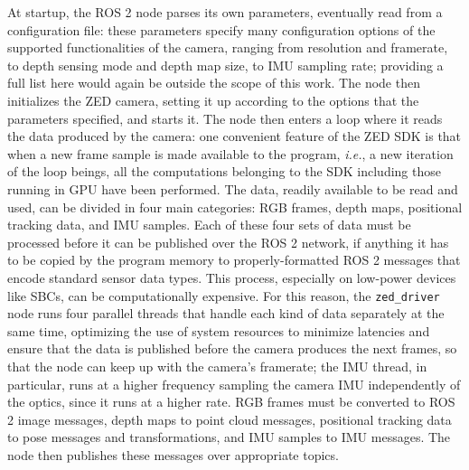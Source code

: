 At startup, the ROS 2 node parses its own parameters, eventually read from a configuration file: these parameters specify many configuration options of the supported functionalities of the camera, ranging from resolution and framerate, to depth sensing mode and depth map size, to IMU sampling rate; providing a full list here would again be outside the scope of this work. The node then initializes the ZED camera, setting it up according to the options that the parameters specified, and starts it. The node then enters a loop where it reads the data produced by the camera: one convenient feature of the ZED SDK is that when a new frame sample is made available to the program, \emph{i.e.}, a new iteration of the loop beings, all the computations belonging to the SDK including those running in GPU have been performed. The data, readily available to be read and used, can be divided in four main categories: RGB frames, depth maps, positional tracking data, and IMU samples. Each of these four sets of data must be processed before it can be published over the ROS 2 network, if anything it has to be copied by the program memory to properly-formatted ROS 2 messages that encode standard sensor data types. This process, especially on low-power devices like SBCs, can be computationally expensive. For this reason, the \texttt{zed\_driver} node runs four parallel threads that handle each kind of data separately at the same time, optimizing the use of system resources to minimize latencies and ensure that the data is published before the camera produces the next frames, so that the node can keep up with the camera's framerate; the IMU thread, in particular, runs at a higher frequency sampling the camera IMU independently of the optics, since it runs at a higher rate. RGB frames must be converted to ROS 2 image messages, depth maps to point cloud messages, positional tracking data to pose messages and transformations, and IMU samples to IMU messages. The node then publishes these messages over appropriate topics.

